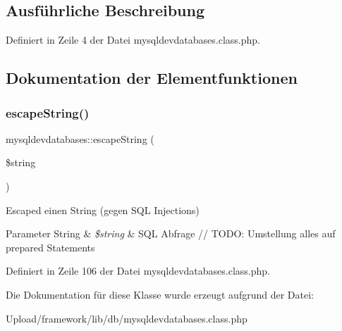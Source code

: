 \subsection{Ausführliche Beschreibung}


Definiert in Zeile 4 der Datei mysqldevdatabases.\+class.\+php.



\subsection{Dokumentation der Elementfunktionen}
\mbox{\label{classmysqldevdatabases_a2586a7e38266035410c83c0e7b801d8c}} 
\subsubsection{\texorpdfstring{escape\+String()}{escapeString()}}
{\footnotesize\ttfamily mysqldevdatabases\+::escape\+String (\begin{DoxyParamCaption}\item[{}]{\$string }\end{DoxyParamCaption})}

Escaped einen String (gegen S\+QL Injections) 
\begin{DoxyParams}[1]{Parameter}
String & {\em \$string} & S\+QL Abfrage // T\+O\+DO\+: Umstellung alles auf prepared Statements \\
\hline
\end{DoxyParams}


Definiert in Zeile 106 der Datei mysqldevdatabases.\+class.\+php.



Die Dokumentation für diese Klasse wurde erzeugt aufgrund der Datei\+:\begin{DoxyCompactItemize}
\item 
Upload/framework/lib/db/mysqldevdatabases.\+class.\+php\end{DoxyCompactItemize}
